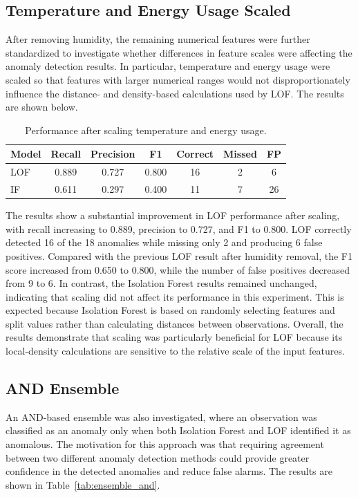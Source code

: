 \documentclass[a4paper,12pt]{article}
\begin{document}
\subsection{Temperature and Energy Usage Scaled}

After removing humidity, the remaining numerical features were further standardized to investigate whether differences in feature scales were affecting the anomaly detection results. In particular, temperature and energy usage were scaled so that features with larger numerical ranges would not disproportionately influence the distance- and density-based calculations used by LOF. The results are shown below.

\begin{table}
	\centering
	\small
	\setlength{\tabcolsep}{5pt}
	\caption{Performance after scaling temperature and energy usage.}
	\label{tab:scaled_results}
	\begin{tabular}{lcccccc}
		\hline
		Model & Recall & Precision & F1 & Correct & Missed & FP \\
		\hline
		LOF & 0.889 & 0.727 & 0.800 & 16 & 2 & 6 \\
		IF & 0.611 & 0.297 & 0.400 & 11 & 7 & 26 \\
		\hline
	\end{tabular}
\end{table}

The results show a substantial improvement in LOF performance after scaling, with recall increasing to 0.889, precision to 0.727, and F1 to 0.800. LOF correctly detected 16 of the 18 anomalies while missing only 2 and producing 6 false positives. Compared with the previous LOF result after humidity removal, the F1 score increased from 0.650 to 0.800, while the number of false positives decreased from 9 to 6. In contrast, the Isolation Forest results remained unchanged, indicating that scaling did not affect its performance in this experiment. This is expected because Isolation Forest is based on randomly selecting features and split values rather than calculating distances between observations. Overall, the results demonstrate that scaling was particularly beneficial for LOF because its local-density calculations are sensitive to the relative scale of the input features.

\subsection{AND Ensemble}

An AND-based ensemble was also investigated, where an observation was classified as an anomaly only when both Isolation Forest and LOF identified it as anomalous. The motivation for this approach was that requiring agreement between two different anomaly detection methods could provide greater confidence in the detected anomalies and reduce false alarms. The results are shown in Table~\ref{tab:ensemble_and}.
\end{document}
